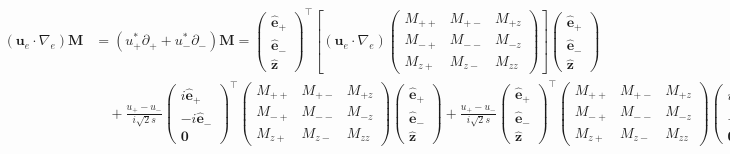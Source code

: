 \begin{equation}\label{eqn:u-dot-grad-M-canonical}
\begin{aligned}
    (\mathbf{u}_e\cdot \nabla_e) \mathbf{M} &= (u_+^* \partial_+ + u_-^* \partial_-) \mathbf{M} = \begin{pmatrix}\hat{\mathbf{e}}_+ \\ \hat{\mathbf{e}}_- \\ \hat{\mathbf{z}}\end{pmatrix}^\top 
    \left[\left(\mathbf{u}_e\cdot \nabla_e\right) \begin{pmatrix}
        M_{++} & M_{+-} & M_{+z} \\ 
        M_{-+} & M_{--} & M_{-z} \\ 
        M_{z+} & M_{z-} & M_{zz}
    \end{pmatrix}\right]
    \begin{pmatrix}\hat{\mathbf{e}}_+ \\ \hat{\mathbf{e}}_- \\ \hat{\mathbf{z}}\end{pmatrix} \\ 
    &\quad + \frac{u_+ - u_-}{i\sqrt{2} s} \begin{pmatrix} i\hat{\mathbf{e}}_+ \\ -i\hat{\mathbf{e}}_- \\ \mathbf{0}\end{pmatrix}^\top \begin{pmatrix}
        M_{++} & M_{+-} & M_{+z} \\ 
        M_{-+} & M_{--} & M_{-z} \\ 
        M_{z+} & M_{z-} & M_{zz}
    \end{pmatrix} \begin{pmatrix}\hat{\mathbf{e}}_+ \\ \hat{\mathbf{e}}_- \\ \hat{\mathbf{z}}\end{pmatrix} 
    + \frac{u_+ - u_-}{i\sqrt{2} s} \begin{pmatrix}\hat{\mathbf{e}}_+ \\ \hat{\mathbf{e}}_- \\ \hat{\mathbf{z}}\end{pmatrix}^\top \begin{pmatrix}
        M_{++} & M_{+-} & M_{+z} \\ 
        M_{-+} & M_{--} & M_{-z} \\ 
        M_{z+} & M_{z-} & M_{zz}
    \end{pmatrix} \begin{pmatrix} i\hat{\mathbf{e}}_+ \\ -i\hat{\mathbf{e}}_- \\ \mathbf{0}\end{pmatrix} \\ 

\end{aligned}
\end{equation}
